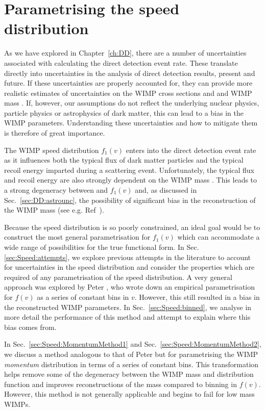 \chapter{Parametrising the speed distribution}
\label{ch:Speed}

As we have explored in Chapter~\ref{ch:DD}, there are a number of uncertainties associated with calculating the direct detection event rate. These translate directly into uncertainties in the analysis of direct detection results, present and future. If these uncertainties are properly accounted for, they can provide more realistic estimates of uncertainties on the WIMP cross sections \sigmapsi and \sigmapsd and WIMP mass \mchi. If, however, our assumptions do not reflect the underlying nuclear physics, particle physics or astrophysics of dark matter, this can lead to a bias in the WIMP parameters. Understanding these uncertainties and how to mitigate them is therefore of great importance.

The WIMP speed distribution $f_1(v)$ enters into the direct detection event rate as it influences both the typical flux of dark matter particles and the typical recoil energy imparted during a scattering event. Unfortunately, the typical flux and recoil energy are also strongly dependent on the WIMP mass \mchi. This leads to a strong degeneracy between \mchi and $f_1(v)$ and, as discussed in Sec.~\ref{sec:DD:astrounc}, the possibility of significant bias in the reconstruction of the WIMP mass (see e.g. Ref~\cite{Peter:2011}).

Because the speed distribution is so poorly constrained, an ideal goal would be to construct the most general parametrisation for $f_1(v)$ which can accommodate a wide range of possibilities for the true functional form. In Sec.~ \ref{sec:Speed:attempts}, we explore previous attempts in the literature to account for uncertainties in the speed distribution and consider the properties which are required of any parametrisation of the speed distribution. A very general approach was explored by Peter \cite{Peter:2011}, who wrote down an empirical parametrisation for $f(v)$ as a series of constant bins in $v$. However, this still resulted in a bias in the reconstructed WIMP parameters. In Sec.~\ref{sec:Speed:binned}, we analyse in more detail the performance of this method and attempt to explain where this bias comes from.

In Sec.~\ref{sec:Speed:MomentumMethod1} and Sec.~\ref{sec:Speed:MomentumMethod2}, we discuss a method analogous to that of Peter but for parametrising the WIMP \textit{momentum} distribution in terms of a series of constant bins. This transformation helps remove some of the degeneracy between the WIMP mass and distribution function and improves reconstructions of the mass compared to binning in $f(v)$. However, this method is not generally applicable and begins to fail for low mass WIMPs.

